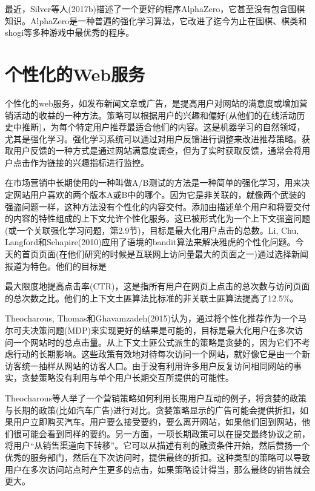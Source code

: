 最近，Silver等人(2017b)描述了一个更好的程序AlphaZero，它甚至没有包含围棋知识。AlphaZero是一种普遍的强化学习算法，它改进了迄今为止在围棋、棋类和shogi等多种游戏中最优秀的程序。


\section{个性化的Web服务}

个性化的web服务，如发布新闻文章或广告，是提高用户对网站的满意度或增加营销活动的收益的一种方法。策略可以根据用户的兴趣和偏好(从他们的在线活动历史中推断)，为每个特定用户推荐最适合他们的内容。这是机器学习的自然领域，尤其是强化学习。强化学习系统可以通过对用户反馈进行调整来改进推荐策略。获取用户反馈的一种方式是通过网站满意度调查，但为了实时获取反馈，通常会将用户点击作为链接的兴趣指标进行监控。

在市场营销中长期使用的一种叫做A/B测试的方法是一种简单的强化学习，用来决定网站用户喜欢的两个版本A或B中的哪个。因为它是非关联的，就像两个武装的强盗问题一样，这种方法没有个性化的内容交付。添加由描述单个用户和将要交付的内容的特性组成的上下文允许个性化服务。这已被形式化为一个上下文强盗问题(或一个关联强化学习问题，第2.9节)，目标是最大化用户点击的总数。Li, Chu, Langford和Schapire(2010)应用了语境的bandit算法来解决雅虎的个性化问题。今天的首页页面(在他们研究的时候是互联网上访问量最大的页面之一)通过选择新闻报道为特色。他们的目标是

最大限度地提高点击率(CTR)，这是指所有用户在网页上点击的总次数与访问页面的总次数之比。他们的上下文土匪算法比标准的非关联土匪算法提高了12.5\%。

Theocharous, Thomas和Ghavamzadeh(2015)认为，通过将个性化推荐作为一个马尔可夫决策问题(MDP)来实现更好的结果是可能的，目标是最大化用户在多次访问一个网站时的总点击量。从上下文土匪公式派生的策略是贪婪的，因为它们不考虑行动的长期影响。这些政策有效地对待每次访问一个网站，就好像它是由一个新访客统一抽样从网站的访客人口。由于没有利用许多用户反复访问相同网站的事实，贪婪策略没有利用与单个用户长期交互所提供的可能性。

Theocharous等人举了一个营销策略如何利用长期用户互动的例子，将贪婪的政策与长期的政策(比如汽车广告)进行对比。贪婪策略显示的广告可能会提供折扣，如果用户立即购买汽车。用户要么接受要约，要么离开网站，如果他们回到网站，他们很可能会看到同样的要约。另一方面，一项长期政策可以在提交最终协议之前，将用户“从销售渠道向下转移”。它可以从描述有利的融资条件开始，然后赞扬一个优秀的服务部门，然后在下次访问时，提供最终的折扣。这种类型的策略可以导致用户在多次访问站点时产生更多的点击，如果策略设计得当，那么最终的销售就会更大。

